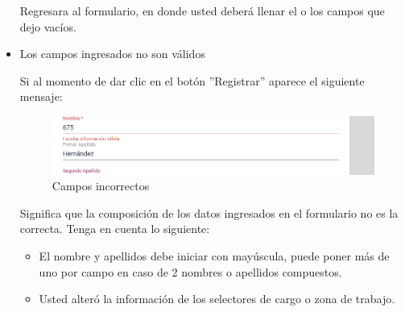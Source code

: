 \begin{itemize}
                         Regresara al formulario, en donde usted deberá llenar el o los campos que dejo vacíos. 
                    
                    \item Los campos ingresados no son válidos
                
                        Si al momento de dar clic en el botón ''Registrar'' aparece el siguiente mensaje:
                         \begin{figure}[!hbtp]
                            \centering
                            \includegraphics[width=0.4\linewidth]{images/SP1/MSG35}
                            \caption{Campos incorrectos}
                            \label{mensaje35}
                        
                        \end{figure}
                    
                        Significa que la composición de los datos ingresados en el formulario no es la correcta. Tenga en cuenta lo siguiente:
                    
                        \begin{itemize}
                            \item El nombre y apellidos debe iniciar con mayúscula, puede poner más de uno por campo en caso de 2 nombres o apellidos compuestos.
                            \item Usted alteró la información de los selectores de cargo o zona de trabajo.
                        \end{itemize}
                    
                \end{itemize}

\newpage

            \hypertarget{editar-RH}{}
